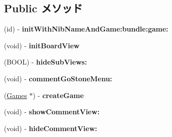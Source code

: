 \subsection*{Public メソッド}
\begin{DoxyCompactItemize}
\item 
\hypertarget{interface_abstract_record_view_controller_a1b7e23969bdfd31a40bcb96a3ace9db4}{
(id) -\/ {\bfseries initWithNibNameAndGame:bundle:game:}}
\label{interface_abstract_record_view_controller_a1b7e23969bdfd31a40bcb96a3ace9db4}

\item 
\hypertarget{interface_abstract_record_view_controller_a439cd9960b3b729fe932df6201d913a1}{
(void) -\/ {\bfseries initBoardView}}
\label{interface_abstract_record_view_controller_a439cd9960b3b729fe932df6201d913a1}

\item 
\hypertarget{interface_abstract_record_view_controller_a5c1ebc2a0be8d378f5c7f58552575896}{
(BOOL) -\/ {\bfseries hideSubViews:}}
\label{interface_abstract_record_view_controller_a5c1ebc2a0be8d378f5c7f58552575896}

\item 
\hypertarget{interface_abstract_record_view_controller_a160875d6c608a4c35496f671bf8cd8ec}{
(void) -\/ {\bfseries commentGoStoneMenu:}}
\label{interface_abstract_record_view_controller_a160875d6c608a4c35496f671bf8cd8ec}

\item 
\hypertarget{interface_abstract_record_view_controller_aa813c99049d9925edc590cc79199da5e}{
(\hyperlink{interface_games}{Games} $\ast$) -\/ {\bfseries createGame}}
\label{interface_abstract_record_view_controller_aa813c99049d9925edc590cc79199da5e}

\item 
\hypertarget{interface_abstract_record_view_controller_a82e716f77a003cef242f02a887a5aff3}{
(void) -\/ {\bfseries showCommentView:}}
\label{interface_abstract_record_view_controller_a82e716f77a003cef242f02a887a5aff3}

\item 
\hypertarget{interface_abstract_record_view_controller_a407cf65034096ae1bb6bf44cefc9ca96}{
(void) -\/ {\bfseries hideCommentView:}}
\label{interface_abstract_record_view_controller_a407cf65034096ae1bb6bf44cefc9ca96}


\end{DoxyCompactItemize}
